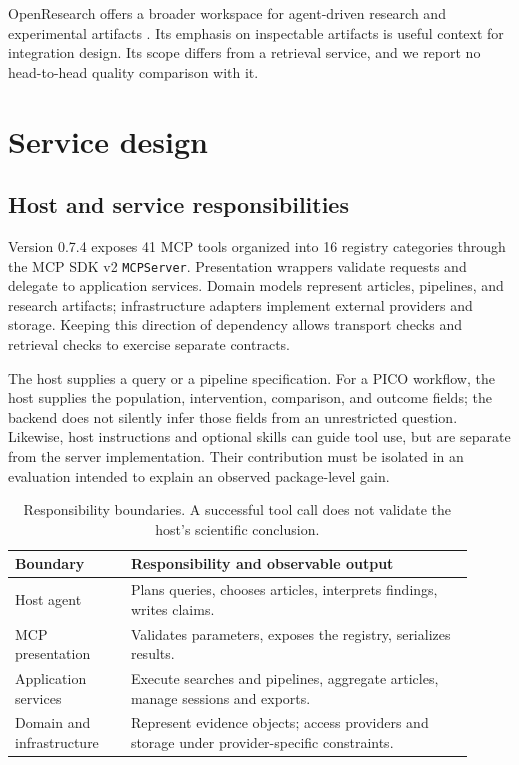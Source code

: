 \documentclass[11pt]{article}
\begin{document}
OpenResearch offers a broader workspace for agent-driven research and experimental
artifacts \citep{openresearch2026}. Its emphasis on inspectable artifacts is useful
context for integration design. Its scope differs from a retrieval service, and
we report no head-to-head quality comparison with it.

\section{Service design}
\subsection{Host and service responsibilities}
Version 0.7.4 exposes 41 MCP tools organized into 16 registry categories through
the MCP SDK v2 \texttt{MCPServer}. Presentation wrappers validate requests and
delegate to application services. Domain models represent articles, pipelines,
and research artifacts; infrastructure adapters implement external providers
and storage. Keeping this direction of dependency allows transport checks and
retrieval checks to exercise separate contracts.

The host supplies a query or a pipeline specification. For a PICO workflow, the
host supplies the population, intervention, comparison, and outcome fields; the
backend does not silently infer those fields from an unrestricted question.
Likewise, host instructions and optional skills can guide tool use, but are
separate from the server implementation. Their contribution must be isolated in
an evaluation intended to explain an observed package-level gain.

\begin{table}[htbp]
\centering\small
\begin{tabular}{p{0.23\linewidth}p{0.68\linewidth}}
\toprule
Boundary & Responsibility and observable output \\
\midrule
Host agent & Plans queries, chooses articles, interprets findings, writes claims. \\
MCP presentation & Validates parameters, exposes the registry, serializes results. \\
Application services & Execute searches and pipelines, aggregate articles, manage sessions and exports. \\
Domain and infrastructure & Represent evidence objects; access providers and storage under provider-specific constraints. \\
\bottomrule
\end{tabular}
\caption{Responsibility boundaries. A successful tool call does not validate the host's scientific conclusion.}
\end{table}
\end{document}
